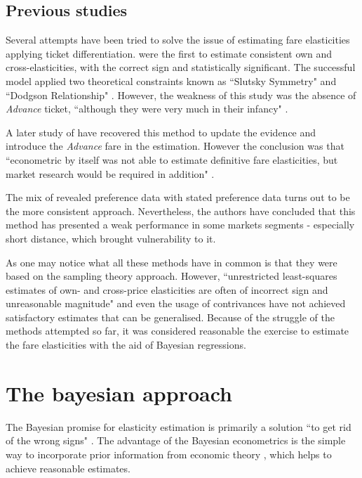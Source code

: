 \subsection{Previous studies}

Several attempts have been tried to solve the issue of estimating fare elasticities applying ticket differentiation. \cite{wardman2003} were the first to estimate consistent own and cross-elasticities, with the correct sign and statistically significant. The successful model applied two theoretical constraints known as ``Slutsky Symmetry" \citep{wardman2003} and ``Dodgson Relationship" \citep{wardman2003}. However, the weakness of this study was the absence of \textit{Advance} ticket, ``although they were very much in their infancy" \citep{its-systra-report}.

A later study of \cite{its-systra-report} have recovered this method to update the evidence and introduce the \textit{Advance} fare in the estimation. However the conclusion was that ``econometric by itself was not able to estimate definitive fare elasticities, but market research would be required in addition" \citep[p.~93]{its-systra-report}.

The mix of revealed preference data with stated preference data turns out to be the more consistent approach. Nevertheless, the authors have concluded that this method has presented a weak performance in some markets segments - especially short distance, which brought vulnerability to it.

As one may notice what all these methods have in common is that they were based on the sampling theory approach. However, ``unrestricted least-squares estimates of own- and cross-price elasticities are often of incorrect sign and unreasonable magnitude" \citep[p.~413]{montgomery1999} and even the usage of contrivances have not achieved satisfactory estimates that can be generalised.  Because of the struggle of the methods attempted so far, it was considered reasonable the exercise to estimate the fare elasticities with the aid of Bayesian regressions.

\section{The bayesian approach}

The Bayesian promise for elasticity estimation is primarily a solution ``to get rid of the wrong signs" \citep[p.~36]{griffiths1988}. The advantage of the Bayesian econometrics is the simple way to incorporate prior information from economic theory \citep{griffiths1988}, which helps to achieve reasonable estimates. 

